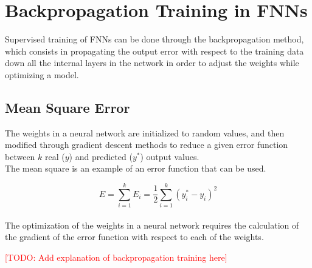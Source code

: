 \section{Backpropagation Training in FNNs}
Supervised training of FNNs can be done through the backpropagation method, which consists in propagating the output error with respect to the training data down all the internal layers in the network in order to adjust the weights while optimizing a model.
\\
\subsection{Mean Square Error}
The weights in a neural network are initialized to random values, and then modified through gradient descent methods to reduce a given error function between $k$ real ($y$) and predicted ($y^*$) output values. 
\\
The mean square is an example of an error function that can be used.

\begin{equation}\label{eq:3}
E= \sum_{i=1}^{k} E_i =\frac{1}{2}\sum_{i=1}^{k}(y_i^* - y_i)^2
\end{equation}
\\
The optimization of the weights in a neural network requires the calculation of the gradient of the error function with respect to each of the weights.




\textcolor{red} {[TODO: Add explanation of backpropagation training here] }